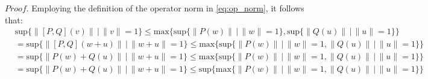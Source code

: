 $\textit{Proof.}$ \quad Employing the definition of the operator norm in \autoref{eq:op_norm}, it follows that:
\begin{equation} \label{eq:cond_opnorm2}
  \begin{split}
  &\text{sup}{\{ \lVert [P,Q] (v) \rVert  \hspace{2pt} |  \hspace{2pt}  \lVert v \rVert=1  \}}  \leq \text{max} \{  \text{sup} \{ \lVert P (w) \rVert  \hspace{2pt} |  \hspace{2pt}  \lVert w \rVert =1 \}, \text{sup} \{\lVert Q (u) \rVert  \hspace{2pt} |  \hspace{2pt}  \lVert u \rVert=1  \} \} \\
  & = \text{sup}{\{ \lVert [P,Q] (w+u) \rVert  \hspace{2pt} |  \hspace{2pt}  \lVert w+u \rVert=1  \}} \leq \text{max} \{  \text{sup} \{ \lVert P (w) \rVert  \hspace{2pt} |  \hspace{2pt}  \lVert w \rVert = 1, \lVert Q (u) \rVert  \hspace{2pt} |  \hspace{2pt}  \lVert u \rVert=1  \} \} \\
  & =  \text{sup}{\{ \lVert P (w) + Q (u) \rVert  \hspace{2pt} |  \hspace{2pt}  \lVert w+u \rVert=1  \}} \leq \text{max} \{  \text{sup} \{ \lVert P (w) \rVert  \hspace{2pt} |  \hspace{2pt}  \lVert w \rVert =1, \lVert Q (u) \rVert  \hspace{2pt} |  \hspace{2pt}  \lVert u \rVert=1  \} \} \\
  &  =  \text{sup}{\{ \lVert P (w) + Q (u) \rVert  \hspace{2pt} |  \hspace{2pt}  \lVert w+u \rVert=1  \}} \leq \text{sup} \{  \text{max} \{ \lVert P (w) \rVert  \hspace{2pt} |  \hspace{2pt}  \lVert w \rVert =1, \lVert Q (u) \rVert  \hspace{2pt} |  \hspace{2pt}  \lVert u \rVert=1  \} \} \\
\end{split}
\end{equation}

